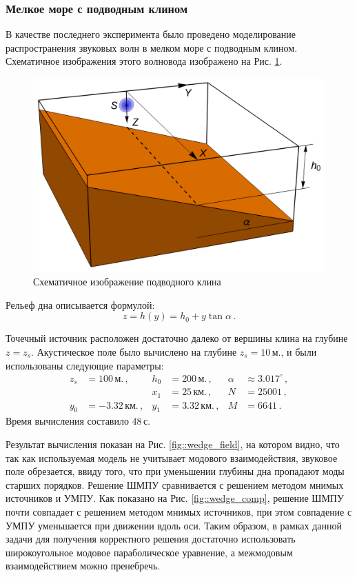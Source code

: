 \documentclass{fefu}
\newcommand{\pa}[1]{\left(#1\right)}
\begin{document}
            \subsubsection{Мелкое море с подводным клином}
                \par В качестве последнего эксперимента было проведено моделирование распространения звуковых волн в мелком море с подводным клином. Схематичное изображения этого волновода изображено на Рис. \ref{fig::wedge}.
                \begin{figure}[h]
                    \centering
                    \includegraphics[width=0.49\linewidth]{wedge}
                    \caption{\label{fig::wedge}Схематичное изображение подводного клина}
                \end{figure}
                Рельеф дна описывается формулой:
                \begin{equation}
                    z=h\pa{y}=h_0+y\tan\alpha\,.
                \end{equation}
                \par Точечный источник расположен достаточно далеко от вершины клина на глубине $z=z_s$. Акустическое поле было вычислено на глубине $z_s=10\,\text{м.}$, и были использованы следующие параметры:
                \begin{equation}
                    \begin{aligned}
                        z_s&=100\,\text{м.}\,,&h_0&=200\,\text{м.}\,,&\alpha&\approx3.017^\circ\,,\\
                        &&x_1&=25\,\text{км.}\,,&N&=25001\,,\\
                        y_0&=-3.32\,\text{км.}\,,&y_1&=3.32\,\text{км.}\,,&M&=6641\,.
                    \end{aligned}
                \end{equation}
                Время вычисления составило $48\,\text{с.}$
                \par Результат вычисления показан на Рис. \ref{fig::wedge_field}, на котором видно, что так как используемая модель не учитывает модового взаимодействия, звуковое поле обрезается, ввиду того, что при уменьшении глубины дна пропадают моды старших порядков. Решение ШМПУ сравнивается с решением методом мнимых источников \cite{deane93,tang18} и УМПУ. Как показано на Рис. \ref{fig::wedge_comp}, решение ШМПУ почти совпадает с решением методом мнимых источников, при этом совпадение с УМПУ уменьшается при движении вдоль оси. Таким образом, в рамках данной задачи для получения корректного решения достаточно использовать широкоугольное модовое параболическое уравнение, а межмодовым взаимодействием можно пренебречь. 
\end{document}
